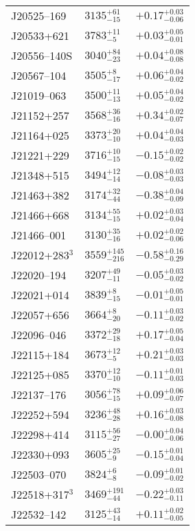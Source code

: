 \documentclass{aa}
\begin{document}
\begin{appendix}
\begin{center}
\begin{xtabular}{lll}
J20525--169 & $3135_{-15}^{+61}$ & $+0.17_{-0.06}^{+0.03}$ \\
J20533+621 & $3783_{-5}^{+11}$ & $+0.03_{-0.01}^{+0.05}$ \\
J20556--140S & $3040_{-23}^{+84}$ & $+0.04_{-0.08}^{+0.08}$ \\
J20567--104 & $3505_{-17}^{+8}$ & $+0.06_{-0.02}^{+0.04}$ \\
J21019--063 & $3500_{-13}^{+11}$ & $+0.05_{-0.02}^{+0.04}$ \\
J21152+257 & $3568_{-16}^{+36}$ & $+0.34_{-0.07}^{+0.02}$ \\
J21164+025 & $3373_{-10}^{+20}$ & $+0.04_{-0.03}^{+0.04}$ \\
J21221+229 & $3716_{-15}^{+10}$ & $-0.15_{-0.02}^{+0.02}$ \\
J21348+515 & $3494_{-14}^{+12}$ & $-0.08_{-0.03}^{+0.03}$ \\
J21463+382 & $3174_{-44}^{+32}$ & $-0.38_{-0.09}^{+0.04}$ \\
J21466+668 & $3134_{-15}^{+55}$ & $+0.02_{-0.04}^{+0.03}$ \\
J21466--001 & $3130_{-16}^{+35}$ & $+0.02_{-0.06}^{+0.02}$ \\
J22012+283$^{3}$ & $3559_{-216}^{+145}$ & $-0.58_{-0.29}^{+0.16}$ \\
J22020--194 & $3207_{-11}^{+49}$ & $-0.05_{-0.02}^{+0.03}$ \\
J22021+014 & $3839_{-15}^{+8}$ & $-0.01_{-0.01}^{+0.05}$ \\
J22057+656 & $3664_{-20}^{+8}$ & $-0.11_{-0.02}^{+0.03}$ \\
J22096--046 & $3372_{-18}^{+29}$ & $+0.17_{-0.04}^{+0.05}$ \\
J22115+184 & $3673_{-5}^{+12}$ & $+0.21_{-0.03}^{+0.03}$ \\
J22125+085 & $3370_{-10}^{+12}$ & $-0.11_{-0.03}^{+0.01}$ \\
J22137--176 & $3056_{-15}^{+78}$ & $+0.09_{-0.07}^{+0.06}$ \\
J22252+594 & $3236_{-28}^{+48}$ & $+0.16_{-0.08}^{+0.03}$ \\
J22298+414 & $3115_{-27}^{+56}$ & $-0.00_{-0.06}^{+0.04}$ \\
J22330+093 & $3605_{-9}^{+25}$ & $-0.15_{-0.04}^{+0.01}$ \\
J22503--070 & $3824_{-8}^{+6}$ & $-0.09_{-0.02}^{+0.01}$ \\
J22518+317$^{3}$ & $3469_{-44}^{+191}$ & $-0.22_{-0.11}^{+0.03}$ \\
J22532--142 & $3125_{-14}^{+43}$ & $+0.11_{-0.05}^{+0.02}$ \\

\end{xtabular}
\end{center}
\end{appendix}
\end{document}
